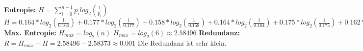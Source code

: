 \documentclass[fleqn,a4paper,12pt]{article}
\begin{document}
	\textbf{Entropie:} \newline
	$H = \sum_{i=0}^{n-1} p_i log_2(\frac{1}{p_i})$ \newline
	$H = 0.164*log_2(\frac{1}{0.164}) + 0.177*log_2(\frac{1}{0.177}) + 0.158*log_2(\frac{1}{0.158}) + 0.164*log_2(\frac{1}{0.164}) + 0.175*log_2(\frac{1}{0.175}) + 0.162*log_2(\frac{1}{0.162}) \approx 2.58373$ \newline
	\textbf{Max. Entropie:} \newline
	$H_{max} = log_2(n)$ \newline
	$H_{max} = log_2(6) \approx 2.58496$ \newline
	\textbf{Redundanz:} \newline
	$R = H_{max} - H = 2.58496 - 2.58373 \approx 0.001$ \newline
	Die Redundanz ist sehr klein.
\end{document}
